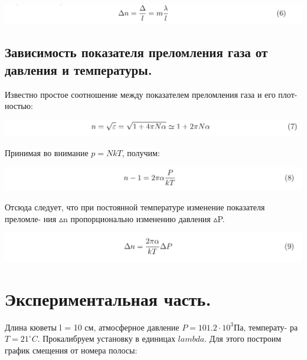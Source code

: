 \documentclass[a4paper,12pt]{article} %
\begin{document}
\begin{center}
    \includegraphics[scale=0.4]{eq4}
\end{center}

\subsection{Зависимость показателя преломления газа от давления и температуры.}

Известно простое соотношение между показателем преломления газа и его плот-
ностью:

\begin{center}
    \includegraphics[scale=0.4]{eq5}
\end{center}
Принимая во внимание $p = NkT$, получим:

\begin{center}
    \includegraphics[scale=0.4]{eq6}
\end{center}

Отсюда следует, что при постоянной температуре изменение показателя преломле-
ния $\vartriangle$n пропорционально изменению давления $\vartriangle$P.

\begin{center}
    \includegraphics[scale=0.4]{eq7}
\end{center}

\section{Экспериментальная часть.}

Длина кюветы l = 10 см, атмосферное давление $P = 101.2 \cdot 10^3$Па, температу-
ра $T = 21^\circ C$. Прокалибруем установку в единицах $lambda$. Для этого построим график
смещения от номера полосы:
 
\end{document}
